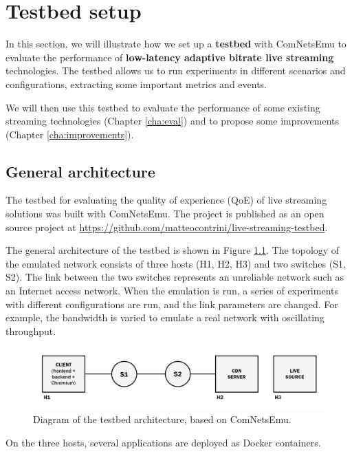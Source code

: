 \chapter{Testbed setup}
\label{cha:testbed}

In this section, we will illustrate how we set up a \textbf{testbed} with ComNetsEmu to evaluate the performance of \textbf{low-latency adaptive bitrate live streaming} technologies. The testbed allows us to run experiments in different scenarios and configurations, extracting some important metrics and events.

We will then use this testbed to evaluate the performance of some existing streaming technologies (Chapter \ref{cha:eval}) and to propose some improvements (Chapter \ref{cha:improvements}).

\section{General architecture}
\label{sec:testbed/architecture}

The testbed for evaluating the quality of experience (QoE) of live streaming solutions was built with ComNetsEmu. The project is published as an open source project at \url{https://github.com/matteocontrini/live-streaming-testbed}.

The general architecture of the testbed is shown in Figure \ref{fig:testbed}. The topology of the emulated network consists of three hosts (H1, H2, H3) and two switches (S1, S2). The link between the two switches represents an unreliable network such as an Internet access network. When the emulation is run, a series of experiments with different configurations are run, and the link parameters are changed. For example, the bandwidth is varied to emulate a real network with oscillating throughput.

\begin{figure}[h]
    \centering
    \includegraphics[width=\textwidth]{res/testbed.png}
    \caption{Diagram of the testbed architecture, based on ComNetsEmu.}
    \label{fig:testbed}
\end{figure}

On the three hosts, several applications are deployed as Docker containers.

